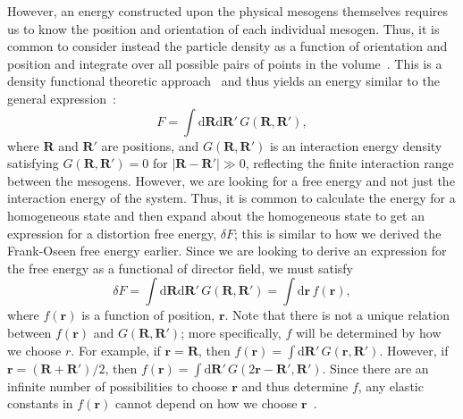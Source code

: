 However, an energy constructed upon the physical mesogens themselves requires us to know the position and orientation of each individual mesogen.
Thus, it is common to consider instead the particle density as a function of orientation and position and integrate over all possible pairs of points in the volume~\cite{RN222}.
This is a density functional theoretic approach~\cite{RN223} and thus yields an energy similar to the general expression~\cite{RN56,RN55}:
\begin{equation}
  F = \int \textrm{d}\mathbf{R} \textrm{d}\mathbf{R}' \, G(\mathbf{R},\mathbf{R}'),
\end{equation}
where $\mathbf{R}$ and $\mathbf{R}'$ are positions, and $G(\mathbf{R},\mathbf{R}')$ is an interaction energy density satisfying $G(\mathbf{R},\mathbf{R}') = 0$ for $|\mathbf{R}-\mathbf{R}'| \gg 0$, reflecting the finite interaction range between the mesogens.
However, we are looking for a free energy and not just the interaction energy of the system.
Thus, it is common to calculate the energy for a homogeneous state and then expand about the homogeneous state to get an expression for a distortion free energy, $\delta F$; this is similar to how we derived the Frank-Oseen free energy earlier.
Since we are looking to derive an expression for the free energy as a functional of director field, we must satisfy
\begin{equation}
  \delta F = \int \textrm{d}\mathbf{R} \textrm{d}\mathbf{R}' \, G(\mathbf{R},\mathbf{R}')
  = \int \textrm{d} \mathbf{r} \, f(\mathbf{r}),\label{e:2-NonlocalLocal}
\end{equation}
where $f(\mathbf{r})$ is a function of position, $\mathbf{r}$.
Note that there is not a unique relation between $f(\mathbf{r})$ and $G(\mathbf{R},\mathbf{R}')$; more specifically, $f$ will be determined by how we choose $r$.
For example, if $\mathbf{r} = \mathbf{R}$, then $f(\mathbf{r}) = \int \textrm{d}\mathbf{R}' \, G(\mathbf{r},\mathbf{R}')$.
However, if $\mathbf{r} = (\mathbf{R} + \mathbf{R}')/2$, then $f(\mathbf{r}) = \int \textrm{d}\mathbf{R}' \, G(2\mathbf{r} - \mathbf{R}',\mathbf{R}')$.
Since there are an infinite number of possibilities to choose $\mathbf{r}$ and thus determine $f$, any elastic constants in $f(\mathbf{r})$ cannot depend on how we choose $\mathbf{r}$~\cite{RN55}.
